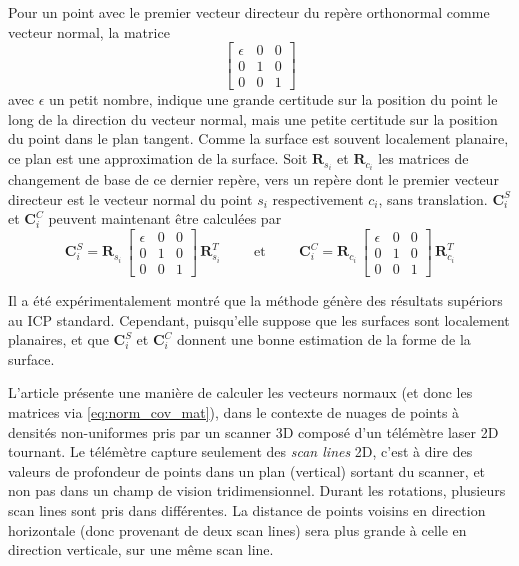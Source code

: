 \documentclass[a4paper,10pt]{scrreprt}
\begin{document}
Pour un point avec le premier vecteur directeur du repère orthonormal comme vecteur normal, la matrice
\begin{equation}
	\begin{bmatrix}
		\epsilon & 0 & 0 \\
		0 & 1 & 0 \\
		0 & 0 & 1
	\end{bmatrix}
\end{equation}
avec $\epsilon$ un petit nombre, indique une grande certitude sur la position du point le long de la direction du vecteur normal, mais une petite certitude sur la position du point dans le plan tangent. Comme la surface est souvent localement planaire, ce plan est une approximation de la surface. Soit $\mathbf{R}_{s_i}$ et $\mathbf{R}_{c_i}$ les matrices de changement de base de ce dernier repère, vers un repère dont le premier vecteur directeur est le vecteur normal du point $s_i$ respectivement $c_i$, sans translation. $\mathbf{C}^S_i$ et $\mathbf{C}^C_i$ peuvent maintenant être calculées par
\begin{equation} \label{eq:norm_cov_mat}
	\mathbf{C}^S_i = \mathbf{R}_{s_i} \, \begin{bmatrix}
		\epsilon & 0 & 0 \\
		0 & 1 & 0 \\
		0 & 0 & 1
	\end{bmatrix} \, \mathbf{R}_{s_i}^T
	\hspace{1cm} \text{et} \hspace{1cm}
	\mathbf{C}^C_i = \mathbf{R}_{c_i} \, \begin{bmatrix}
		\epsilon & 0 & 0 \\
		0 & 1 & 0 \\
		0 & 0 & 1
	\end{bmatrix} \, \mathbf{R}_{c_i}^T
\end{equation}

Il a été expérimentalement montré que la méthode génère des résultats supériors au ICP standard. \cite{Sega2009} Cependant, puisqu'elle suppose que les surfaces sont localement planaires, et que $\mathbf{C}^S_i$ et $\mathbf{C}^C_i$ donnent une bonne estimation de la forme de la surface.

L'article \cite{Holz2014} présente une manière de calculer les vecteurs normaux (et donc les matrices via \ref{eq:norm_cov_mat}), dans le contexte de nuages de points à densités non-uniformes pris par un scanner 3D composé d'un télémètre laser 2D tournant. Le télémètre capture seulement des \emph{scan lines} 2D, c'est à dire des valeurs de profondeur de points dans un plan (vertical) sortant du scanner, et non pas dans un champ de vision tridimensionnel. Durant les rotations, plusieurs scan lines sont pris dans différentes. La distance de points voisins en direction horizontale (donc provenant de deux scan lines) sera plus grande à celle en direction verticale, sur une même scan line.
\end{document}
